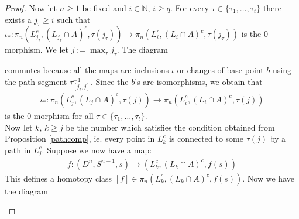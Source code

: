 \documentclass[a4paper,11pt]{article}
\theoremstyle{definition}
\theoremstyle{plain}
\theoremstyle{remark}
\begin{document}
{\begin{proof}
Now let $n\geq 1$ be fixed and $i\in \mathbb{N}$, $i\geq q$. For every $\tau\in \{\tau_1,\dots,\tau_{t}\}$ there exists a $j_{\tau}\geq i$ such that $\iota_{*}:\pi_{n}(L_{j_{\tau}}^c,(L_{j_{\tau}}\cap A)^c, \tau(j_{\tau}))\rightarrow \pi_{n}(L_i^c,(L_i\cap A)^c,\tau(j_{\tau}))$ is the $0$ morphism. We let $j:=\max_{\tau} j_{\tau}$. The diagram 


 \begin{figure}[H]
\center
{}
 \end{figure}
 
commutes because all the maps are inclusions $\iota$ or changes of base point $b$ using the path segment $\tau_{[j_{\tau},j]}^{-1}$. Since the $b$'s are isomorphisms, we obtain that 
 \begin{align*}
\iota_{*}:\pi_{n}(L_j^c,(L_j\cap A)^c, \tau(j))\rightarrow \pi_{n}(L_i^c,(L_i\cap A)^c,\tau(j))
\end{align*}
is the $0$ morphism for all $\tau\in \{\tau_1,\dots,\tau_{t}\}$.\\

Now let $k$, $k\geq j$ be the number which satisfies the condition obtained from Proposition \ref{pathcomp}, ie. every point in  $L_{k}^{c}$ is connected to some $\tau(j)$ by a path in $L_{j}^c$. Suppose we now have a map:
\begin{align*}
f: (D^n,S^{n-1},s)\rightarrow (L_{k}^c,(L_k\cap A)^c, f(s))
\end{align*}
This defines a homotopy class $[f]\in \pi_{n}(L_{k}^c,(L_k\cap A)^c, f(s))$. Now we have the diagram
 
 \begin{figure}[H]
\center
{}
 \end{figure}
 

\end{proof}}
\end{document}
